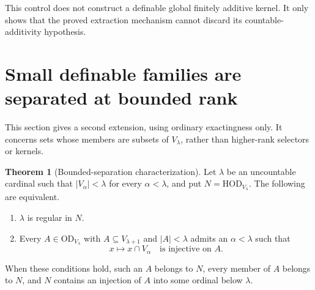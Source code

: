 \documentclass[11pt,letterpaper]{article}
\theoremstyle{definition}
\newtheorem{theorem}[definition]{Theorem}
\numberwithin{equation}{section}
\newcommand{\HOD}{\mathrm{HOD}}
\newcommand{\OD}{\mathrm{OD}}
\newcommand{\NN}{\HOD_{V_\lambda}}
\begin{document}
This control does not construct a definable global finitely additive kernel. It only shows that the proved extraction mechanism cannot discard its countable-additivity hypothesis.

\section{Small definable families are separated at bounded rank}\label{sec:pinning}

This section gives a second extension, using ordinary exactingness only. It concerns sets whose members are subsets of $V_\lambda$, rather than higher-rank selectors or kernels.

\begin{theorem}[Bounded-separation characterization]\label{thm:pinning}
Let $\lambda$ be an uncountable cardinal such that $|V_\alpha|<\lambda$ for every $\alpha<\lambda$, and put $N=\NN$. The following are equivalent.
\begin{enumerate}
\item $\lambda$ is regular in $N$.
\item Every $A\in\OD_{V_\lambda}$ with $A\subseteq V_{\lambda+1}$ and $|A|<\lambda$ admits an $\alpha<\lambda$ such that
\[
 x\longmapsto x\cap V_\alpha
 \quad\text{is injective on }A.
\]
\end{enumerate}
When these conditions hold, such an $A$ belongs to $N$, every member of $A$ belongs to $N$, and $N$ contains an injection of $A$ into some ordinal below $\lambda$.
\end{theorem}
\end{document}
